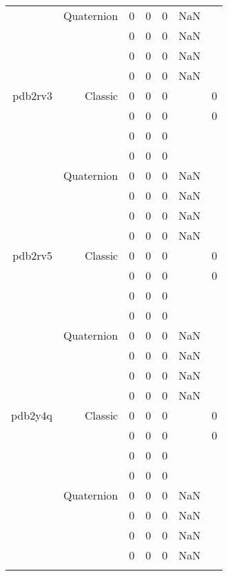 \begin{xltabular}{\textwidth}{r|rcccSc}
& Quaternion & 0 & 0 & 0 & NaN & \\
& & 0 & 0 & 0 & NaN & \\
& & 0 & 0 & 0 & NaN & \\
& & 0 & 0 & 0 & NaN & \\ \addlinespace
pdb2rv3 & Classic & 0 & 0 & 0 & & 0 \\
& & 0 & 0 & 0 & & 0 \\
& & 0 & 0 & 0 & & \\
& & 0 & 0 & 0 & & \\
& Quaternion & 0 & 0 & 0 & NaN & \\
& & 0 & 0 & 0 & NaN & \\
& & 0 & 0 & 0 & NaN & \\
& & 0 & 0 & 0 & NaN & \\ \addlinespace
pdb2rv5 & Classic & 0 & 0 & 0 & & 0 \\
& & 0 & 0 & 0 & & 0 \\
& & 0 & 0 & 0 & & \\
& & 0 & 0 & 0 & & \\
& Quaternion & 0 & 0 & 0 & NaN & \\
& & 0 & 0 & 0 & NaN & \\
& & 0 & 0 & 0 & NaN & \\
& & 0 & 0 & 0 & NaN & \\ \addlinespace
pdb2y4q & Classic & 0 & 0 & 0 & & 0 \\
& & 0 & 0 & 0 & & 0 \\
& & 0 & 0 & 0 & & \\
& & 0 & 0 & 0 & & \\
& Quaternion & 0 & 0 & 0 & NaN & \\
& & 0 & 0 & 0 & NaN & \\
& & 0 & 0 & 0 & NaN & \\
& & 0 & 0 & 0 & NaN & \\ \addlinespace
\end{xltabular}
